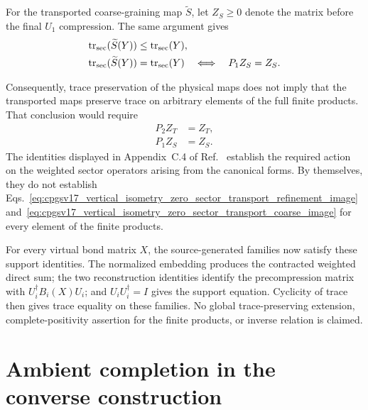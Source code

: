 \documentclass{article}
\begin{document}
For the transported coarse-graining map $\widetilde S$, let $Z_S\geq0$ denote
the matrix before the final $U_1$ compression. The same argument gives
\begin{align}
    \operatorname{tr}_{\mathrm{sec}}(\widetilde S(Y))
        &\leq
        \operatorname{tr}_{\mathrm{sec}}(Y),
    \label{eq:cpgsv17_vertical_isometry_zero_sector_coarse_trace_loss}\\
    \operatorname{tr}_{\mathrm{sec}}(\widetilde S(Y))
        &=
        \operatorname{tr}_{\mathrm{sec}}(Y)
        \quad\Longleftrightarrow\quad
        P_1Z_S=Z_S.
    \label{eq:cpgsv17_vertical_isometry_zero_sector_coarse_trace_equality}
\end{align}

Consequently, trace preservation of the physical maps does not imply that the
transported maps preserve trace on arbitrary elements of the full finite
products. That conclusion would require
\begin{align}
    P_2Z_T
        &=Z_T,
    \label{eq:cpgsv17_vertical_isometry_zero_sector_transport_refinement_image}\\
    P_1Z_S
        &=Z_S.
    \label{eq:cpgsv17_vertical_isometry_zero_sector_transport_coarse_image}
\end{align}
The identities displayed in Appendix~C.4 of
Ref.~\cite{Cirac2016MPDO_arXiv} establish the required action on the weighted
sector operators arising from the canonical forms. By themselves, they do not
establish
Eqs.~\ref{eq:cpgsv17_vertical_isometry_zero_sector_transport_refinement_image}
and~\ref{eq:cpgsv17_vertical_isometry_zero_sector_transport_coarse_image}
for every element of the finite products.

For every virtual bond matrix $X$, the source-generated families now satisfy
these support identities. The normalized embedding produces the contracted
weighted direct sum; the two reconstruction identities identify the
precompression matrix with $U_i^\dagger B_i(X)U_i$; and
$U_iU_i^\dagger=I$ gives the support equation. Cyclicity of trace then gives
trace equality on these families. No global trace-preserving extension,
complete-positivity assertion for the finite products, or inverse relation is
claimed.

\section{Ambient completion in the converse construction}
\end{document}
